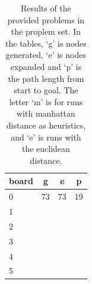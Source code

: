 \begin{table}[h]
\begin{minipage}{\textwidth}
\begin{minipage}{0.33\textwidth}
\begin{tabular}{l | c | c | c }
				board 		& g 		& e 		& p 	\\ \hline
				0 			& 73 		& 73 		& 19	\\
				1 			& 			& 			& 		\\
				2 			& 			& 			& 		\\
				3 			& 			& 			& 		\\
				4 			& 			& 			& 		\\
				5 			& 			& 			& 		\\
			\end{tabular}
		\end{minipage}
	\end{minipage}
	\caption{Results of the provided problems in the proplem set. In the tables, `g' is nodes generated, `e' is nodes expanded and `p' is the path length from start to goal. The letter `m' is for runs with manhattan distance as heuristics, and `e' is runs with the euclidean distance.}
	\label{table:results}
\end{table}
